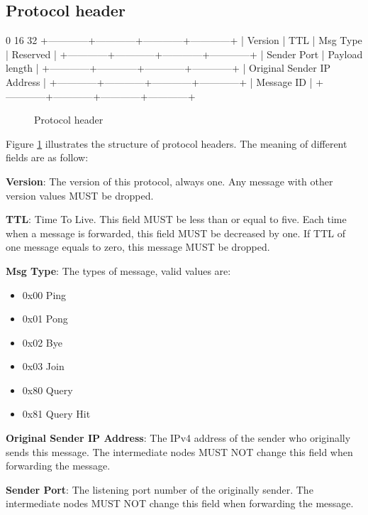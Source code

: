 \documentclass[12pt, a4paper]{article}
\begin{document}
\subsection{Protocol header}
\begin{verbbox}
0                          16                        32
+------------+------------+------------+------------+
|  Version   |     TTL    | Msg Type   |  Reserved  |
+------------+------------+------------+------------+
|       Sender Port       |       Payload length    |
+------------+------------+------------+------------+
|            Original Sender IP Address             |
+------------+------------+------------+------------+
|                     Message ID                    |
+------------+------------+------------+------------+
\end{verbbox}

\begin{figure}[h!]
  \centering
  \theverbbox
  \caption{Protocol header}
    \label{fig:header}
\end{figure}

Figure \ref{fig:header} illustrates the structure of protocol headers.
The meaning of different fields are as follow:

\textbf{Version}: The version of this protocol, always one.
Any message with other version values MUST be dropped.

\textbf{TTL}: Time To Live.
This field MUST be less than or equal to five.
Each time when a message is forwarded, this field MUST be decreased by one.
If TTL of one message equals to zero, this message MUST be dropped.

\textbf{Msg Type}: The types of message, valid values are:
\begin{itemize}
\item 0x00 Ping
\item 0x01 Pong
\item 0x02 Bye
\item 0x03 Join
\item 0x80 Query
\item 0x81 Query Hit
\end{itemize}

\textbf{Original Sender IP Address}: The IPv4 address of the sender who originally sends this message.
The intermediate nodes MUST NOT change this field when forwarding the message.

\textbf{Sender Port}: The listening port number of the originally sender.
The intermediate nodes MUST NOT change this field when forwarding the message.
\end{document}
